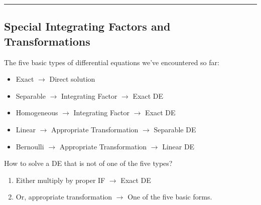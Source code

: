 

\vspace{20pt}\rule{3in}{1pt}
\subsection{Special Integrating Factors and Transformations}
The five basic types of differential equations we've encountered so far:\\
\begin{itemize}
    \item Exact $ \to $ Direct solution
    \item Separable $ \to $ Integrating Factor $ \to $ Exact DE
    \item Homogeneous $ \to $ Integrating Factor $ \to $ Exact DE
    \item Linear $ \to $ Appropriate Transformation $ \to $ Separable DE
    \item Bernoulli $ \to $ Appropriate Transformation $ \to $ Linear DE
\end{itemize}

How to solve a DE that is not of one of the five types?
\begin{enumerate}
    \item Either multiply by proper IF $ \to $ Exact DE
    \item Or, appropriate transformation $ \to $ One of the five basic forms.
\end{enumerate}

